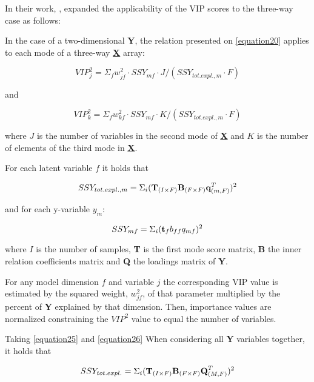 In their work, \textcite{favilla2013assessing}, expanded the applicability of the VIP scores to the three-way case as follows:

In the case of a two-dimensional \textbf{Y}, the relation presented on \autoref{equation20} applies to each mode of a three-way \textbf{\underline{X}} array:

\begin{equation}
VIP^2_j=\Sigma_fw^2_{jf} \cdot SSY_{mf} \cdot J/(SSY_{tot.expl.,m} \cdot F)
\label{equation23}
\end{equation}

and

\begin{equation}
VIP^2_k=\Sigma_fw^2_{kf} \cdot SSY_{mf} \cdot K/(SSY_{tot.expl.,m} \cdot F)
\label{equation24}
\end{equation}

where $J$ is the number of variables in the second mode of \textbf{\underline{X}} and $K$ is the number of elements of the third mode in \textbf{\underline{X}}.

For each latent variable $f$ it holds that

\begin{equation}
SSY_{tot.expl.,m}=\Sigma_i(\textbf{\text{T}}_{(I \times F)}\textbf{\text{B}}_{(F \times F)}\textbf{\text{q}}^T_{(m, F)})^2
\label{equation25}
\end{equation}

and for each y-variable $y_m$:

\begin{equation}
SSY_{mf}=\Sigma_i(\textbf{\text{t}}_fb_{ff}q_{mf})^2
\label{equation26}
\end{equation}

where $I$ is the number of samples, \textbf{T} is the first mode score matrix, \textbf{B} the inner relation coefficients matrix and \textbf{Q} the loadings matrix of \textbf{Y}.

For any model dimension $f$ and variable $j$ the corresponding VIP value is estimated by the squared weight, $w_{jf}^2$, of that parameter multiplied by the percent of \textbf{Y} explained by that dimension. Then, importance values are normalized constraining the $VIP^2$ value to equal the number of variables.

Taking \autoref{equation25} and \autoref{equation26} When considering all \textbf{Y} variables together, it holds that

\begin{equation}
SSY_{tot.expl.}=\Sigma_i(\textbf{\text{T}}_{(I \times F)}\textbf{\text{B}}_{(F \times F)}\textbf{\text{Q}}^T_{(M, F)})^2
\label{equation27}
\end{equation}

